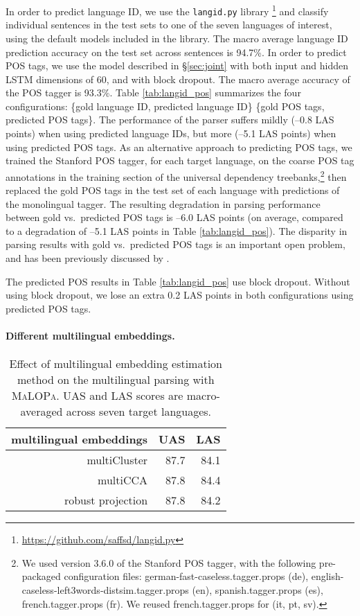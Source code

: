 \documentclass[11pt]{article}
\newcommand{\malopa}{\textsc{MaLOPa}}
\begin{document}
In order to predict language ID, we use the \texttt{langid.py} library \cite{lui:12}\footnote{\url{https://github.com/saffsd/langid.py}} and classify individual sentences in the test sets to one of the seven languages of interest, using the default models included in the library.
The macro average language ID prediction accuracy on the test set across sentences is 94.7\%.
In order to predict POS tags, we use the model described in \S\ref{sec:joint} with both input and hidden LSTM dimensions of 60, and with block dropout.
The macro average accuracy of the POS tagger is 93.3\%.
Table \ref{tab:langid_pos} summarizes the four configurations: \{gold language ID, predicted language ID\}  \{gold POS tags, predicted POS tags\}.
The performance of the parser suffers mildly (--0.8 LAS points) when using predicted language IDs, but more (--5.1 LAS points) when using predicted POS tags.
As an alternative approach to predicting POS tags, we trained the Stanford POS tagger, for each target language, on the coarse POS tag annotations in the training section of the universal dependency treebanks,\footnote{We used version 3.6.0 of the Stanford POS tagger, with the following pre-packaged configuration files: german-fast-caseless.tagger.props (de), english-caseless-left3words-distsim.tagger.props (en), spanish.tagger.props (es), french.tagger.props (fr). We reused french.tagger.props for (it, pt, sv).} then replaced the gold POS tags in the test set of each language with predictions of the monolingual tagger.
The resulting degradation in parsing performance between gold vs.~predicted POS tags is --6.0 LAS points (on average, compared to a degradation of --5.1 LAS points in Table \ref{tab:langid_pos}).
The disparity in parsing results with gold vs.~predicted POS tags is an important open problem, and has been previously discussed by .

The predicted POS results in Table \ref{tab:langid_pos} use block dropout.
Without using block dropout, we lose an extra 0.2 LAS points in both configurations using predicted POS tags.

\paragraph{Different multilingual embeddings.}

\begin{table}[!]
\centering
\begin{tabular}{r|r|r}
multilingual embeddings           & UAS & LAS   \\ \hline
multiCluster           & 87.7  & 84.1   \\
multiCCA               & 87.8  & 84.4   \\
robust projection      & 87.8  & 84.2
\end{tabular}

\caption{Effect of multilingual embedding estimation method on the multilingual parsing with \malopa.
UAS and LAS scores are macro-averaged across seven target languages.
\label{tab:multilingual_embeddings}}
\end{table}
\end{document}
